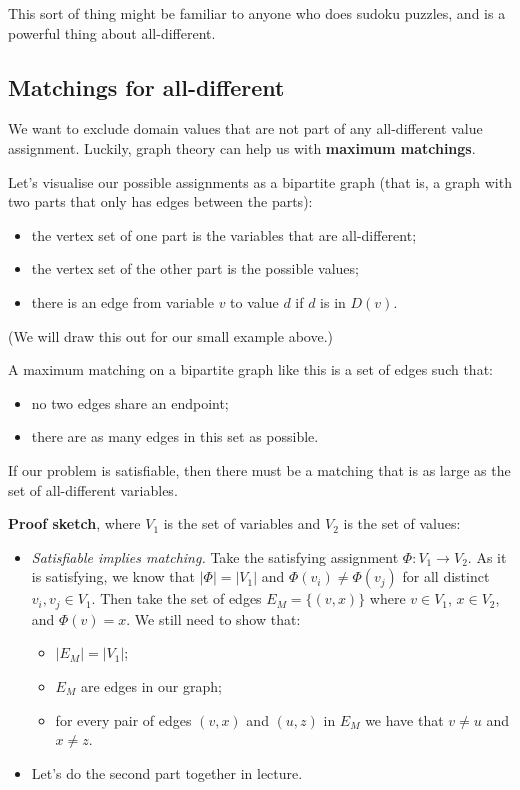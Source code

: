 \documentclass[11pt]{article}
\begin{document}
This sort of thing might be familiar to anyone who does sudoku puzzles, and is a powerful thing about all-different.

\subsection{Matchings for all-different}

We want to exclude domain values that are not part of any all-different value assignment. Luckily, graph theory can help us with \textbf{maximum matchings}.

Let's visualise our possible assignments as a bipartite graph (that is, a graph with two parts that only has edges between the parts):
\begin{itemize}
    \item the vertex set of one part is the variables that are all-different;
    \item the vertex set of the other part is the possible values;
    \item there is an edge from variable $v$ to value $d$ if $d$ is in $D(v)$.
\end{itemize}

(We will draw this out for our small example above.)

A maximum matching on a bipartite graph like this is a set of edges such that:
\begin{itemize}
    \item no two edges share an endpoint;
    \item there are as many edges in this set as possible.
\end{itemize}

If our problem is satisfiable, then there must be a matching that is as large as the set of all-different variables.

\textbf{Proof sketch}, where $V_1$ is the set of variables and $V_2$ is the set of values:
\begin{itemize}
    \item \emph{Satisfiable implies matching.} Take the satisfying assignment $\Phi: V_1 \rightarrow V_2$. As it is satisfying, we know that $|\Phi| = |V_1|$ and $\Phi(v_i) \neq \Phi(v_j)$ for all distinct $v_i, v_j \in V_1$. Then take the set of edges $E_M = \{(v, x)\}$ where $v \in V_1$, $x \in V_2$, and $\Phi(v) = x$. We still need to show that:
    \begin{itemize}
        \item $|E_M| = |V_1|$;
        \item $E_M$ are edges in our graph;
        \item for every pair of edges $(v, x)$ and $(u, z)$ in $E_M$ we have that $v \neq u$ and $x \neq z$.
    \end{itemize}
    \item Let's do the second part together in lecture.
\end{itemize}
\end{document}
